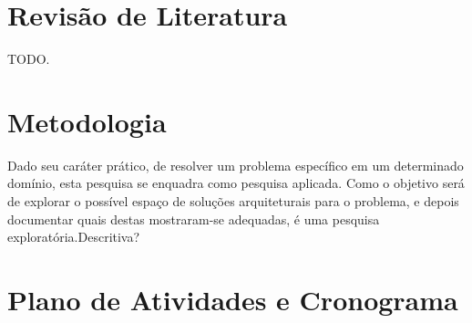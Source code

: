 \documentclass[12pt]{article}
\newcommand{\todo}[1]{\textsf{\color{red}#1}}
\begin{document}
\section{Revisão de Literatura}

\todo{TODO.}

\section{Metodologia}

Dado seu caráter prático, de resolver um problema específico em um determinado domínio, esta pesquisa se enquadra como pesquisa aplicada. Como o objetivo será de explorar o possível espaço de soluções arquiteturais para o problema, e depois documentar quais destas mostraram-se adequadas, é uma pesquisa exploratória.\todo{Descritiva?}

\section{Plano de Atividades e Cronograma}
\end{document}
